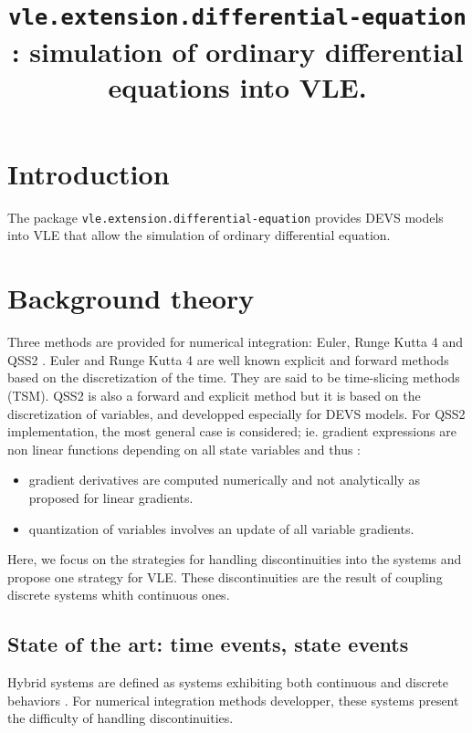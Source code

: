 \documentclass{article}
\title{{\tt vle.extension.differential-equation} : simulation of 
ordinary differential equations into VLE.}
\theoremstyle{remark}
\begin{document}
\maketitle

\tableofcontents

\section{Introduction}

The package {\tt vle.extension.differential-equation} provides DEVS models
into VLE that allow the simulation of ordinary differential equation.


\section{Background theory}

Three methods are provided for numerical integration: Euler, Runge Kutta 4 and
QSS2 \cite{kofman.SIM02}. Euler and Runge Kutta 4 are well known explicit and
forward methods based on the discretization of the time. They are said to be 
time-slicing methods (TSM). QSS2 is also a forward and explicit method but it is
based on the discretization of variables, and developped especially for DEVS
models. For QSS2 implementation, the most general case is considered; 
ie. gradient expressions are non linear
functions depending on all state variables and thus :
\begin{itemize}
 \item gradient derivatives are computed numerically and not analytically as
 proposed for linear gradients.
\item quantization of variables involves an update of all variable gradients. 
\end{itemize}

Here, we focus on the strategies for handling
discontinuities into the systems and propose one strategy for VLE. These
discontinuities are the result of coupling discrete systems whith continuous
ones.

\subsection{State of the art: time events, state events}

Hybrid systems are defined as systems exhibiting both
continuous and discrete behaviors \cite{barros.ACM03}.
For numerical integration methods developper, 
these systems present the difficulty of handling discontinuities.
    
\end{document}
